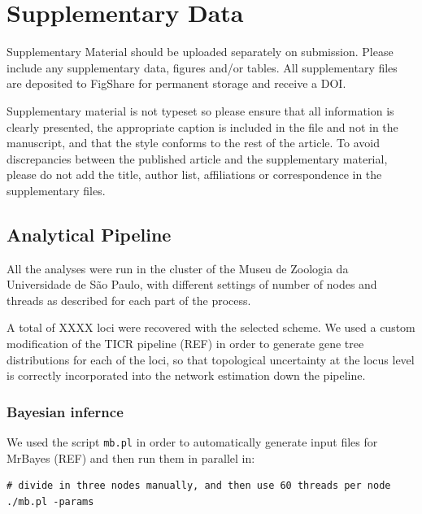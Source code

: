 \documentclass[utf8]{frontiers_suppmat} %
\begin{document}
\onecolumn
{}

\title[Supplementary Material]{{}}


\maketitle


\section{Supplementary Data}

Supplementary Material should be uploaded separately on submission. Please include any supplementary data, figures and/or tables. All supplementary files are deposited to FigShare for permanent storage and receive a DOI.

Supplementary material is not typeset so please ensure that all information is clearly presented, the appropriate caption is included in the file and not in the manuscript, and that the style conforms to the rest of the article. To avoid discrepancies between the published article and the supplementary material, please do not add the title, author list, affiliations or correspondence in the supplementary files.

\subsection{Analytical Pipeline}

All the analyses were run in the cluster of the Museu de Zoologia da Universidade de S\~{a}o Paulo, with different settings of number of nodes and threads as described for each part of the process.

A total of XXXX loci were recovered with the selected scheme. We used a custom modification of the TICR pipeline (REF) in order to generate gene tree distributions for each of the loci, so that topological uncertainty at the locus level is correctly incorporated into the network estimation down the pipeline.

\subsubsection{Bayesian infernce}

We used the script \texttt{mb.pl} in order to automatically generate input files for MrBayes (REF) and then run them in parallel in:

\begin{verbatim}
# divide in three nodes manually, and then use 60 threads per node
./mb.pl -params
\end{verbatim}
\end{document}

